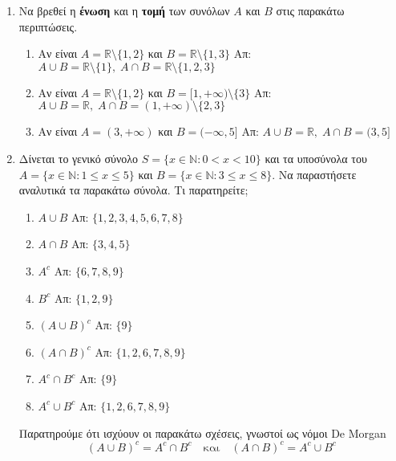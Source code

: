 \begin{enumerate}
  \item Να βρεθεί η \textbf{ένωση} και η \textbf{τομή} των συνόλων $A$ και $B$ στις 
    παρακάτω περιπτώσεις.
    \begin{enumerate}[(\roman*)]
      \item Αν είναι $A=\mathbb{R}\setminus\{1,2\}$ και $B=\mathbb{R}\setminus\{1,3\}$
        \hfill Απ: $ A \cup B = \mathbb{R} \setminus \{ 1 \}, \; A \cap B = \mathbb{R}
        \setminus \{ 1,2,3 \} $ 
      \item Αν είναι $A=\mathbb{R}\setminus\{1,2\}$ και $B=[1,+\infty) \setminus 
        \{ 3 \} $
        \hfill Απ: $ A \cup B = \mathbb{R}, \; A \cap B = (1,+\infty) 
        \setminus \{ 2,3 \}$ 
      \item Αν είναι $A=(3,+\infty)$ και $B=(-\infty,5]$
        \hfill Απ: $ A \cup B = \mathbb{R}, \; A \cap B = (3,5]  $ 
    \end{enumerate}

  \item Δίνεται το γενικό σύνολο $S=\{x\in \mathbb{N} : 0<x<10\}$ και τα υποσύνολα 
    του $A=\{x\in \mathbb{N} : 1\leq x\leq 5\}$ και 
    $B=\{x\in \mathbb{N} : 3\leq x\leq 8\}$. 
    Να παραστήσετε αναλυτικά τα παρακάτω σύνολα.  Τι παρατηρείτε;
    \begin{enumerate}[(\roman*)]
      \item $A\cup B$ \hfill Απ: $ \{ 1,2,3,4,5,6,7,8 \} $ 
      \item $A\cap B$ \hfill Απ: $ \{ 3,4,5 \} $ 
      \item $A^c$ \hfill Απ: $ \{ 6,7,8,9 \} $ 
      \item $B^c$ \hfill Απ: $ \{ 1,2,9 \} $ 
      \item $(A\cup B)^c$ \hfill Απ: $ \{ 9 \} $ 
      \item $(A\cap B)^c$ \hfill Απ: $ \{ 1,2,6,7,8,9 \} $ 
      \item $A^c\cap B^c$ \hfill Απ: $ \{ 9 \} $  
      \item $A^c\cup B^c$ \hfill Απ: $ \{ 1,2,6,7,8,9 \} $ 
    \end{enumerate}
    \begin{rem*}
      Παρατηρούμε ότι ισχύουν οι παρακάτω σχέσεις, γνωστοί ως νόμοι De Morgan
      \[ (A \cup B)^{c} = A^{c} \cap B^{c} \quad \text{και} \quad 
      (A \cap B)^{c} = A^{c} \cup B^{c} \]
    \end{rem*}
\end{enumerate}




